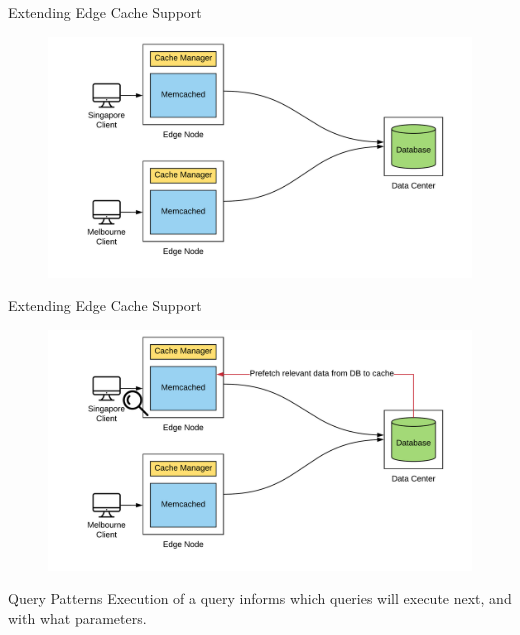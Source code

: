 \documentclass[10pt]{beamer}
\begin{document}
\begin{frame}{Extending Edge Cache Support}
    \begin{figure}
        \center
        \hspace*{-1.5cm}
        \includegraphics[scale=0.17]{apollo_ec_dbl}
    \end{figure}
\end{frame}

\begin{frame}{Extending Edge Cache Support}
    \begin{figure}
        \center
        \hspace*{-1.5cm}
        \includegraphics[scale=0.17]{apollo_ec_dbl_learn}
    \end{figure}
\end{frame}

\begin{frame}{Query Patterns}
    Execution of a query informs which queries will execute next, and
    with what parameters.
\end{frame}
\end{document}
